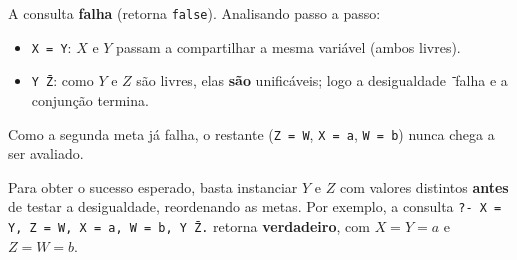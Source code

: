
\begin{solution}
A consulta \textbf{falha} (retorna \texttt{false}). Analisando passo a passo:
\begin{itemize}
    \item \texttt{X = Y}: $X$ e $Y$ passam a compartilhar a mesma variável (ambos livres).
    \item \texttt{Y \= Z}: como $Y$ e $Z$ são livres, elas \textbf{são} unificáveis; logo a desigualdade \texttt{\=} falha e a conjunção termina.
\end{itemize}
Como a segunda meta já falha, o restante (\texttt{Z = W}, \texttt{X = a}, \texttt{W = b}) nunca chega a ser avaliado.

Para obter o sucesso esperado, basta instanciar $Y$ e $Z$ com valores distintos \textbf{antes} de testar a desigualdade, reordenando as metas. Por exemplo, a consulta
\texttt{?- X = Y, Z = W, X = a, W = b, Y \= Z.}
retorna \textbf{verdadeiro}, com $X = Y = a$ e $Z = W = b$.
\end{solution}


